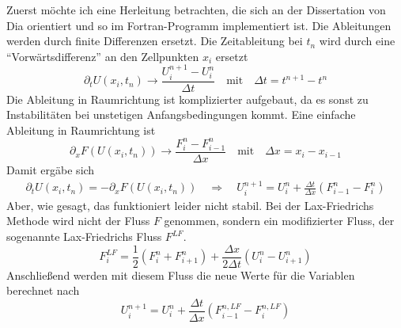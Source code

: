Zuerst möchte ich eine Herleitung betrachten, die sich an der
Dissertation von Dia orientiert und so im Fortran-Programm
implementiert ist. Die Ableitungen werden durch finite Differenzen
ersetzt. Die Zeitableitung bei $t_n$ wird durch eine
``Vorwärtsdifferenz'' an den Zellpunkten $x_i$ ersetzt
\[
\partial_t U(x_i,t_n) \rightarrow \frac{U_i^{n+1} - U_i^n}{\Delta t} \quad
\mbox{mit} \quad \Delta t = t^{n+1} - t^n
\]
Die Ableitung in Raumrichtung ist komplizierter aufgebaut, da es sonst
zu Instabilitäten bei unstetigen Anfangsbedingungen kommt. Eine einfache
Ableitung in Raumrichtung ist
\[
\partial_x F(U(x_i,t_n)) \rightarrow \frac{F_{i}^{n} -
  F_{i-1}^{n}}{\Delta x} \quad \mbox{mit} \quad \Delta x = x_{i} - x_{i-1}
\]
Damit ergäbe sich 
\begin{eqnarray}
\partial_t U(x_i,t_n) = - \partial_x F(U(x_i,t_n)) \quad \Rightarrow\quad
U_i^{n+1} = U_i^n + \frac{\Delta t}{\Delta x}\left(F_{i-1}^{n} -
F_{i}^{n}\right)
\end{eqnarray}
Aber, wie gesagt, das funktioniert leider nicht stabil. Bei der
Lax-Friedrichs Methode wird nicht der Fluss $F$ genommen, sondern ein
modifizierter Fluss, der sogenannte Lax-Friedrichs Fluss $F^{LF}$.
\begin{equation}
F^{LF}_i = \frac{1}{2}\left(F_i^n+F_{i+1}^n \right) + \frac{\Delta x}{2
  \Delta t}\left(U_i^n - U_{i+1}^n \right)\label{eq:fluss_LF}
\end{equation}
Anschließend werden mit diesem Fluss die neue Werte für die Variablen
berechnet nach
\begin{equation}
U_i^{n+1} = U_i^n + \frac{\Delta t}{\Delta x}\left(F_{i-1}^{n,LF} -
F_{i}^{n,LF}\right)\label{eq:update_LF}
\end{equation}

